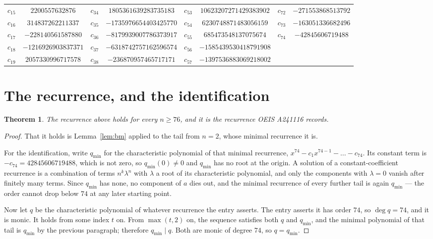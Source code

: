 \documentclass[11pt,a4paper]{article}
\theoremstyle{plain}
\newtheorem{theorem}{Theorem}
\theoremstyle{definition}
\begin{document}
\begin{center}
\begin{tabular}{cccccccc}
$c_{15}$ & $2200557632876$ & $c_{34}$ & $1805361639283735183$ & $c_{53}$ & $10623207271429383902$ & $c_{72}$ & $-271553868513792$ \\
$c_{16}$ & $314837262211337$ & $c_{35}$ & $-1735976654403425770$ & $c_{54}$ & $6230748871483056159$ & $c_{73}$ & $-163051336682496$ \\
$c_{17}$ & $-228140561587880$ & $c_{36}$ & $-8179939007786373917$ & $c_{55}$ & $685473548137075674$ & $c_{74}$ & $-42845606719488$ \\
$c_{18}$ & $-1216926903837371$ & $c_{37}$ & $-6318742757162596574$ & $c_{56}$ & $-1585439530418791908$ &  &  \\
$c_{19}$ & $2057330996717578$ & $c_{38}$ & $-236870957465717171$ & $c_{57}$ & $-1397536883069218002$ &  &  \\
\end{tabular}
\end{center}

\section{The recurrence, and the identification}

\begin{theorem}
The recurrence above holds for every $n\ge76$, and it is the recurrence OEIS A241116 records.
\end{theorem}

\begin{proof}
That it holds is Lemma~\ref{lem:bm} applied to the tail from $n=2$, whose minimal
recurrence it is.

For the identification, write $q_{\min}$ for the characteristic polynomial of that minimal
recurrence, $x^{74}-c_1x^{74-1}-\dots-c_{74}$. Its constant term is
$-c_{74}=42845606719488$, which is not zero, so $q_{\min}(0)\neq0$ and $q_{\min}$ has no
root at the origin. A solution of a constant-coefficient recurrence is a combination of terms
$n^{k}\lambda^{n}$ with $\lambda$ a root of its characteristic polynomial, and only the
components with $\lambda=0$ vanish after finitely many terms. Since $q_{\min}$ has none, no
component of $a$ dies out, and the minimal recurrence of every further tail is again
$q_{\min}$ --- the order cannot drop below $74$ at any later starting point.

Now let $q$ be the characteristic polynomial of whatever recurrence the entry asserts. The
entry asserts it has order $74$, so $\deg q=74$, and it is monic. It holds from some
index $t$ on. From $\max(t,2)$ on, the sequence satisfies both $q$ and $q_{\min}$, and
the minimal polynomial of that tail is $q_{\min}$ by the previous paragraph; therefore
$q_{\min}\mid q$. Both are monic of degree $74$, so $q=q_{\min}$.
\end{proof}
\end{document}
